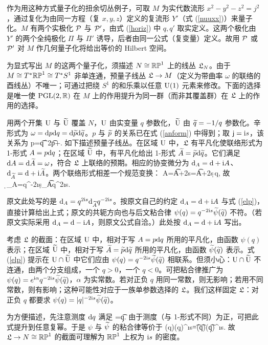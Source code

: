 作为用这种方式量子化的扭余切丛例子，可取 $M$ 为实代数流形 $x^2-y^2-z^2=j^2$，通过复化为由同一方程（复 $x,y,z$）定义的复流形 $Y'$（式 (\ref{nuuxx})）来量子化。$M$ 有两个实极化 $\P$ 与 $\P'$，由式 (\ref{horiz}) 中 $q,q'$ 取实定义。这两个极化由 $Y'$ 的两个全纯极化 $\varPi$ 与 $\varPi'$ 诱导，后者由同一公式（复变量）定义。故用 $\P$ 或 $\P'$ 对 $M$ 作几何量子化将给出等价的 Hilbert 空间。

为显式写出 $M$ 的这两个量子化，须描述 $N\cong\RP^1$ 上的线丛 $\frL_N$。由于 $M\cong T^*\RP^1\cong T^*S^1$ 非单连通，预量子线丛 $\frL\to M$（定义为带曲率 $\omega$ 的联络的酉线丛）不唯一；可通过把绕 $S^1$ 的和乐乘以任意 $\UU(1)$ 元素来修改。下面的选择是唯一使 $\PGL(2,\R)$ 在 $M$ 上的作用提升为同一群（而非其覆盖群）在 $\frL$ 上的作用的选择。

用两个开集 $\U$ 与 $\t\U$ 覆盖 $N$，$\U$ 由实变量 $q$ 参数化，$\t\U$ 由 $\t q=-1/q$ 参数化。辛形式为 $\omega=\d p\d q=\d\t p\d\t q$。$p$ 与 $\t p$ 的关系已在式 (\ref{anform}) 中得到；取 $\j=\i s$，该关系为
\be\label{relp} p=\t q^2\t p+. \ee
如下描述预量子线丛。在区域 $\U$ 中，$\frL$ 有平凡化使联络形式为 1-形式 $A=p\d q$；在区域 $\t\U$ 中，有平凡化给出 1-形式 $\t A=\t p\d\t q$。它们满足 $\d A=\d\t A=\omega$，符合 $\frL$ 上联络的预期。相应的协变微分为 $\d_A=\d+\i A$、$\d_{\t A}=\d+\i\t A$。两个联络形式相差一个规范变换：
\be\label{elp} A=\t A+2s=\t A+2s\,\d\log q, \ee
故
\be \d_A=q^{-2\i s}\d_{\t A}q^{2\i s}. \ee
\begin{kanwu}[共轭方向]原文此处写的是 $\d_A=q^{2\i s}\d_{\t A}q^{-2\i s}$。按原文自己的约定 $\d_A=\d+\i A$ 与式 (\ref{elp})，直接计算给出上式；原文的共轭方向也与后文粘合律 $\psi(q)=q^{-2\i s}\t\psi(\t q)$ 不符。（若原文实际采用 $\d_A=\d-\i A$，则原文公式自洽。）此处按 $\d_A=\d+\i A$ 写出。\end{kanwu}

考虑 $\frL$ 的截面：在区域 $\U$ 中，相对于写 $A=p\d q$ 所用的平凡化，由函数 $\psi(q)$ 表示；在区域 $\t\U$ 中，相对于写 $\t A=\t p\d\t q$ 所用的平凡化，由函数 $\t\psi(\t q)$ 表示。式 (\ref{elp}) 提示在 $\U\cap\t\U$ 中它们应由 $\psi(q)=q^{-2\i s}\t\psi(\t q)$ 相联系。但须小心：$\U\cap\t\U$ 不连通，由两个分支组成，一个 $q>0$，一个 $q<0$。可把粘合律推广为 $\psi(q)=e^{\i\alpha}q^{-2\i s}\t\psi(\t q)$，$\alpha$ 为实常数。若对正负 $q$ 用同一常数，则无影响；若用不同常数，则有影响；这种可能性对应于一族单参数选择的 $\frL$。我们这样固定 $\frL$：对正负 $q$ 都要求 $\psi(q)=|q|^{-2\i s}\t\psi(\t q)$。

为方便描述，先注意测度 $\d q$ 满足
\be\label{measures}=\d\t q.\ee
由于测度（与 1-形式不同）为正，可把此式提升到任意复幂。于是 $\psi$ 与 $\t\psi$ 的粘合律等价于
\be\label{convenone} \psi(q)(\d q)^{\i s}=\t\psi(\t q)(\d\t q)^{\i s}. \ee
故 $\frL\to N\cong\RP^1$ 的截面可理解为 $\RP^1$ 上权为 $\i s$ 的密度。

